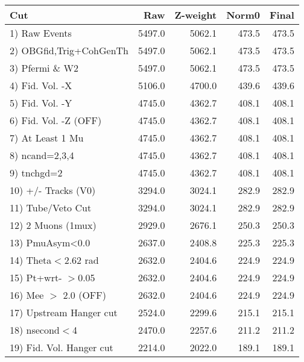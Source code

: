  \begin{table}[h!]\centering
 \begin{tabular}{||l||r|r|r|r||}
 \hline
 \hline
 Cut & Raw & Z-weight & Norm0 & Final \\
 \hline
  1) Raw Events           &      5497.0 &      5062.1 &       473.5 &       473.5 \\
  2) OBGfid,Trig+CohGenTh &      5497.0 &      5062.1 &       473.5 &       473.5 \\
  3) Pfermi \& W2         &      5497.0 &      5062.1 &       473.5 &       473.5 \\
  4) Fid. Vol. -X         &      5106.0 &      4700.0 &       439.6 &       439.6 \\
  5) Fid. Vol. -Y         &      4745.0 &      4362.7 &       408.1 &       408.1 \\
  6) Fid. Vol. -Z (OFF)   &      4745.0 &      4362.7 &       408.1 &       408.1 \\
  7) At Least 1 Mu        &      4745.0 &      4362.7 &       408.1 &       408.1 \\
  8) ncand=2,3,4          &      4745.0 &      4362.7 &       408.1 &       408.1 \\
  9) tnchgd=2             &      4745.0 &      4362.7 &       408.1 &       408.1 \\
 10) +/- Tracks (V0)      &      3294.0 &      3024.1 &       282.9 &       282.9 \\
 11) Tube/Veto Cut        &      3294.0 &      3024.1 &       282.9 &       282.9 \\
 12) 2 Muons (1mux)       &      2929.0 &      2676.1 &       250.3 &       250.3 \\
 13) PmuAsym<0.0          &      2637.0 &      2408.8 &       225.3 &       225.3 \\
 14) Theta$<$2.62 rad     &      2632.0 &      2404.6 &       224.9 &       224.9 \\
 15) Pt+wrt- $>$0.05      &      2632.0 &      2404.6 &       224.9 &       224.9 \\
 16) Mee $>$ 2.0  (OFF)   &      2632.0 &      2404.6 &       224.9 &       224.9 \\
 17) Upstream Hanger cut  &      2524.0 &      2299.6 &       215.1 &       215.1 \\
 18) nsecond$<$4          &      2470.0 &      2257.6 &       211.2 &       211.2 \\
 19) Fid. Vol. Hanger cut &      2214.0 &      2022.0 &       189.1 &       189.1 \\

\end{tabular}
\end{table}
